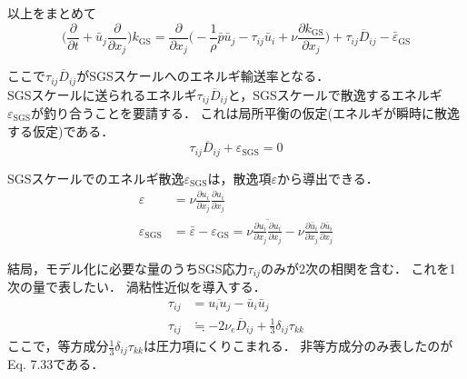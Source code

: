 \documentclass[12pt,a4paper]{jsarticle}
\begin{document}
以上をまとめて
\begin{equation}
  \Big( \frac{\partial}{\partial t} +\bar{u}_j \frac{\partial}{\partial x_j} \Big) k_{\mathrm{GS}} = \frac{\partial}{\partial x_j} \Big( -\frac{1}{\rho}\bar{p}\bar{u}_j -\tau_{ij}\bar{u}_i +\nu \frac{\partial k_{\mathrm{GS}}}{\partial x_j} \Big) +\tau_{ij} \overline{D}_{ij} -\bar{\varepsilon}_{\mathrm{GS}} \tag{7.29}
\label{eq:GSScaleEnergyEquation}
\end{equation}

ここで$\tau_{ij}\overline{D}_{ij}$がSGSスケールへのエネルギ輸送率となる．\\

SGSスケールに送られるエネルギ$\tau_{ij} \overline{D}_{ij}$と，SGSスケールで散逸するエネルギ$\varepsilon_{\mathrm{SGS}}$が釣り合うことを要請する．
これは局所平衡の仮定(エネルギが瞬時に散逸する仮定)である．
\begin{equation}
  \tau_{ij} \overline{D}_{ij} +\varepsilon_{\mathrm{SGS}} = 0 \tag{7.32}
\label{eq:LocalEquilibrium}
\end{equation}

SGSスケールでのエネルギ散逸$\varepsilon_{\mathrm{SGS}}$は，散逸項$\varepsilon$から導出できる．
\begin{align}
  \varepsilon &= \nu \frac{\partial u_i}{\partial x_j} \frac{\partial u_i}{\partial x_j} \nonumber \\
  \varepsilon_{\mathrm{SGS}} &= \bar{\varepsilon} -\varepsilon_{\mathrm{GS}} = \nu \overline{ \frac{\partial u_i}{\partial x_j} \frac{\partial u_i}{\partial x_j} } -\nu \frac{\partial \bar{u}_i}{\partial x_j} \frac{\partial \bar{u}_i}{\partial x_j} \tag{7.31}
\label{eq:SGSDifusion}
\end{align}

結局，モデル化に必要な量のうちSGS応力$\tau_{ij}$のみが2次の相関を含む．
これを1次の量で表したい．
渦粘性近似を導入する．
\begin{align}
  \tau_{ij} &= \overline{u_i u_j} -\bar{u}_i \bar{u}_j \nonumber \\
  \tau_{ij} &\fallingdotseq -2\nu_e \overline{D}_{ij} +\frac{1}{3} \delta_{ij} \tau_{kk}
\label{eq:EddyViscosityApproximation}
\end{align}
ここで，等方成分$\displaystyle{ \frac{1}{3} \delta_{ij} \tau_{kk} }$は圧力項にくりこまれる．
非等方成分のみ表したのがEq. 7.33である．
\end{document}
